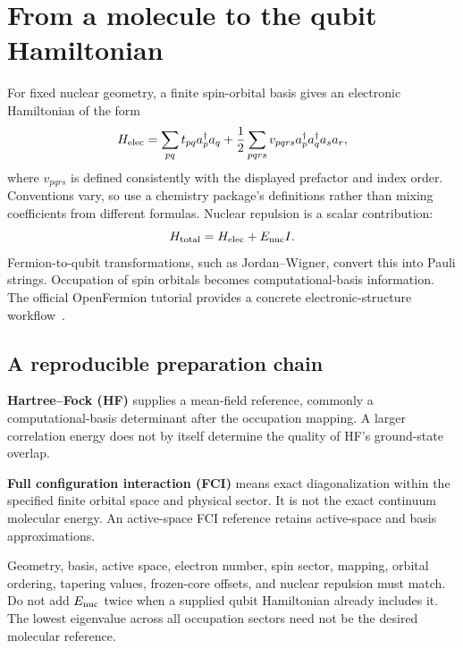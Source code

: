 \documentclass[11pt,a4paper]{article}
\newcommand{\lesson}[2]{\clearpage\section{#1}\label{#2}}
\begin{document}
\lesson{From a molecule to the qubit Hamiltonian}{sec:molecules}
For fixed nuclear geometry, a finite spin-orbital basis gives an electronic Hamiltonian of the form
\[
H_{\rm elec}=\sum_{pq}t_{pq}a_p^\dagger a_q
+\frac12\sum_{pqrs}v_{pqrs}a_p^\dagger a_q^\dagger a_s a_r,
\]
where $v_{pqrs}$ is defined consistently with the displayed prefactor and index order. Conventions vary, so use a chemistry package's definitions rather than mixing coefficients from different formulas. Nuclear repulsion is a scalar contribution:
\[
H_{\rm total}=H_{\rm elec}+E_{\rm nuc}I.
\]
Fermion-to-qubit transformations, such as Jordan--Wigner, convert this into Pauli strings. Occupation of spin orbitals becomes computational-basis information. The official OpenFermion tutorial provides a concrete electronic-structure workflow~\cite{openfermion}.

\subsection*{A reproducible preparation chain}
\begin{center}
\end{center}

\textbf{Hartree--Fock (HF)} supplies a mean-field reference, commonly a computational-basis determinant after the occupation mapping. A larger correlation energy does not by itself determine the quality of HF's ground-state overlap.

\textbf{Full configuration interaction (FCI)} means exact diagonalization within the specified finite orbital space and physical sector. It is not the exact continuum molecular energy. An active-space FCI reference retains active-space and basis approximations.

\begin{caution}
Geometry, basis, active space, electron number, spin sector, mapping, orbital ordering, tapering values, frozen-core offsets, and nuclear repulsion must match. Do not add $E_{\rm nuc}$ twice when a supplied qubit Hamiltonian already includes it. The lowest eigenvalue across all occupation sectors need not be the desired molecular reference.
\end{caution}
\end{document}
